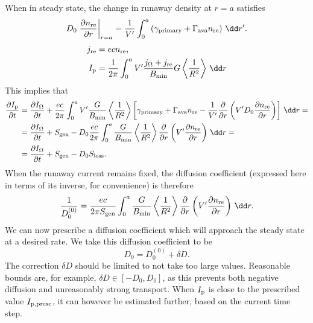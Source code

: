 \documentclass{notes}
\begin{document}
	When in steady state, the change in runaway density at $r=a$ satisfies
	\begin{equation}
		D_0\left.\frac{\partial n_{\rm re}}{\partial r}\right|_{r=a} =
			\frac{1}{V'}\int_0^a \left(
				\gamma_{\rm primary} + \Gamma_{\rm ava}n_{\rm re}
			\right)\,\dd r'.
	\end{equation}
	\begin{equation}
		\begin{aligned}
			j_{\rm re} &= ec n_{\rm re},\\
			I_{\rm p} &= \frac{1}{2\pi}\int_0^a
				V'\frac{j_\Omega + j_{\rm re}}{B_{\rm min}}G
				\left\langle\frac{1}{R^2}\right\rangle\,\dd r
		\end{aligned}
	\end{equation}
	This implies that
	\begin{equation}
		\begin{aligned}
			\frac{\partial I_{\rm p}}{\partial t} &=
				\frac{\partial I_\Omega}{\partial t} +
				\frac{ec}{2\pi}\int_0^a
				V'\frac{G}{B_{\rm min}}\left\langle\frac{1}{R^2}\right\rangle
				\left[
					\gamma_{\rm primary} + \Gamma_{\rm ava}n_{\rm re} -
					\frac{1}{V'}\frac{\partial}{\partial r}
					\left( V'D_0\frac{\partial n_{\rm re}}{\partial r}\right)
				\right]\,\dd r =\\
			&= \frac{\partial I_\Omega}{\partial t} +
				S_{\rm gen} - D_0\frac{ec}{2\pi}\int_0^a
				\frac{G}{B_{\rm min}}\left\langle\frac{1}{R^2}\right\rangle
				\frac{\partial}{\partial r}\left(
					V'\frac{\partial n_{\rm re}}{\partial r}
				\right)\,\dd r =\\
			&= \frac{\partial I_\Omega}{\partial t} + S_{\rm gen} - D_0S_{\rm loss}.
		\end{aligned}
	\end{equation}
	When the runaway current remains fixed, the diffusion coefficient (expressed
	here in terms of its inverse, for convenience) is therefore
	\begin{equation}\label{eq:1OverD0}
		\frac{1}{D_0^{(0)}} =
			\frac{ec}{2\pi S_{\rm gen}}
			\int_0^a \frac{G}{B_{\rm min}}\left\langle\frac{1}{R^2}\right\rangle
			\frac{\partial}{\partial r}\left(
				V'\frac{\partial n_{\rm re}}{\partial r}
			\right)\,\dd r.
	\end{equation}
	We can now prescribe a diffusion coefficient which will approach the steady
	state at a desired rate. We take this diffusion coefficient to be
	\begin{equation}
		D_0 = D_0^{(0)} + \delta D.
	\end{equation}
	The correction $\delta D$ should be limited to not take too large values.
	Reasonable bounds are, for example, $\delta D\in[-D_0, D_0]$, as this
	prevents both negative diffusion and unreasonably strong transport. When
	$I_{\rm p}$ is close to the prescribed value $I_{\rm p,presc}$, it can
	however be estimated further, based on the current time step.
\end{document}
